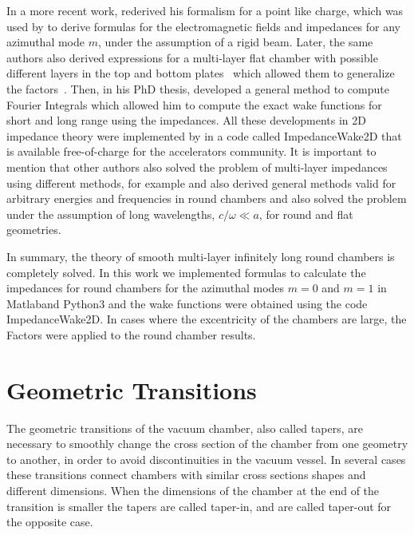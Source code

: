     In a more recent work,  rederived his formalism for a point like charge, which was used by  to derive formulas for the electromagnetic fields and impedances for any azimuthal mode $m$, under the assumption of a rigid beam. Later, the same authors also derived expressions for a multi-layer flat chamber with possible different layers in the top and bottom plates~\cite{Mounet2010a} which allowed them to generalize the \citeauthor{Yokoya1993} factors~\cite{Mounet2010}. Then, in his PhD thesis,  developed a general method to compute Fourier Integrals which allowed him to compute the exact wake functions for short and long range using the impedances. All these developments in 2D impedance theory were implemented by \citeauthor{Mounet2011} in a code called ImpedanceWake2D that is available free-of-charge for the accelerators community. It is important to mention that other authors also solved the problem of multi-layer impedances using different methods, for example  and  also derived general methods valid for arbitrary energies and frequencies in round chambers and  also solved the problem under the assumption of long wavelengths, $c/\omega \ll a$, for round and flat geometries.

    In summary, the theory of smooth multi-layer infinitely long round chambers is completely solved. In this work we implemented \citeauthor{Mounet2009} formulas to calculate the impedances for round chambers for the azimuthal modes $m=0$ and $m=1$ in Matlab\textregistered and Python3 and the wake functions were obtained using the code ImpedanceWake2D. In cases where the excentricity of the chambers are large, the \citeauthor{Yokoya1993} Factors were applied to the round chamber results.

\section{Geometric Transitions}

    The geometric transitions of the vacuum chamber, also called tapers, are necessary to smoothly change the cross section of the chamber from one geometry to another, in order to avoid discontinuities in the vacuum vessel. In several cases these transitions connect chambers with similar cross sections shapes and different dimensions. When the dimensions of the chamber at the end of the transition is smaller the tapers are called taper-in, and are called taper-out for the opposite case.

